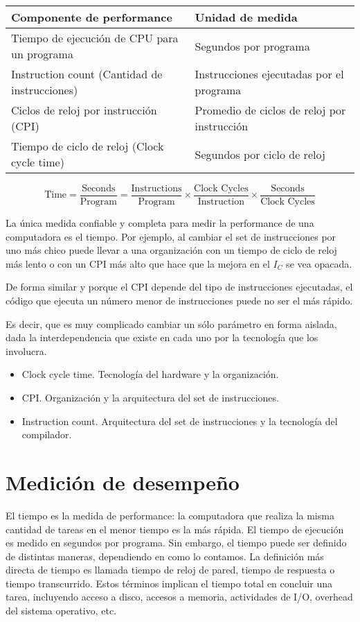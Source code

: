 \begin{table}[h!]
\centering
\begin{tabular}{|l|l|}
\hline
   
\textbf{Componente de performance} & \textbf{Unidad de medida}  \\ \hline
Tiempo de ejecución de CPU para un programa & Segundos por programa \\ \hline
Instruction count (Cantidad de instrucciones) & Instrucciones ejecutadas por el programa \\ \hline
Ciclos de reloj por instrucción (CPI) & Promedio de ciclos de reloj por instrucción \\ \hline
Tiempo de ciclo de reloj (Clock cycle time) & Segundos por ciclo de reloj \\ \hline
\end{tabular}
\end{table}

\[ \text{Time} = \frac{\text{Seconds}}{\text{Program}}= \frac{\text{Instructions}}{\text{Program}} \times \frac{\text{Clock Cycles}}{\text{Instruction}} \times \frac{\text{Seconds}}{\text{Clock Cycles}} \]

La única medida confiable y completa para medir la performance de una computadora es el tiempo. Por ejemplo, al cambiar el set de instrucciones por uno más chico puede llevar a una organización con un tiempo de ciclo de reloj más lento o con un CPI más alto que hace que la mejora en el $I_C$ se vea opacada.

De forma similar y porque el CPI depende del tipo de instrucciones ejecutadas, el código que ejecuta un número menor de instrucciones puede no ser el más rápido.

Es decir, que es muy complicado cambiar un sólo parámetro en forma aislada, dada la interdependencia que existe en cada uno por la tecnología que los involucra.

\begin{itemize}
\item Clock cycle time. Tecnología del hardware y la organización.
\item CPI. Organización y la arquitectura del set de instrucciones.
\item Instruction count. Arquitectura del set de instrucciones y la tecnología del compilador.
\end{itemize}


\section{Medición de desempeño}
El tiempo es la medida de performance: la computadora que realiza la misma cantidad de tareas en el menor tiempo es la más rápida. El tiempo de ejecución es medido en segundos por programa. Sin embargo, el tiempo puede ser definido de distintas maneras, dependiendo en como lo contamos. La definición más directa de tiempo es llamada tiempo de reloj de pared, tiempo de respuesta o tiempo transcurrido. Estos términos implican el tiempo total en concluir una tarea, incluyendo acceso a disco, accesos a memoria, actividades de I/O, overhead del sistema operativo, etc.


